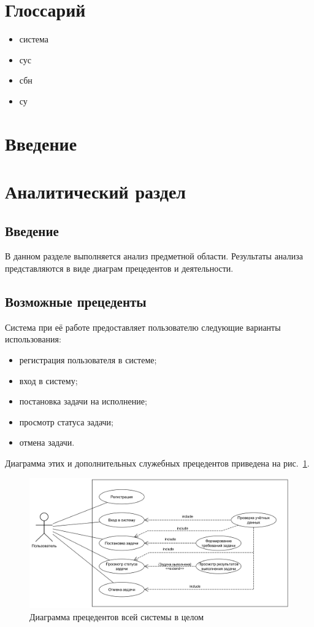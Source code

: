 \documentclass[a4paper,12pt]{report}
\date{\today}
\numberwithin{equation}{section}
\begin{document}
\clearpage
\section*{Глоссарий}
\begin{itemize}
  \item система
  \item сус
  \item сбн
  \item су  
\end{itemize}

\clearpage
\section*{Введение}

\clearpage
\section{Аналитический раздел}
\subsection{Введение}
В данном разделе выполняется анализ предметной области.
Результаты анализа представляются в виде диаграм прецедентов и деятельности.

\subsection{Возможные прецеденты}
Система при её работе предоставляет пользователю следующие варианты использования:
\begin{itemize}
  \item регистрация пользователя в системе;
  \item вход в систему;
  \item постановка задачи на исполнение;
  \item просмотр статуса задачи;
  \item отмена задачи.
\end{itemize}

Диаграмма этих и дополнительных служебных прецедентов приведена на рис.~\ref{fig:prec-common}.

\begin{figure}
  \centering
  \includegraphics[width=\linewidth]{diagrams/common/usecase}
  \caption{Диаграмма прецедентов всей системы в целом}
  \label{fig:prec-common}
\end{figure}
\end{document}
